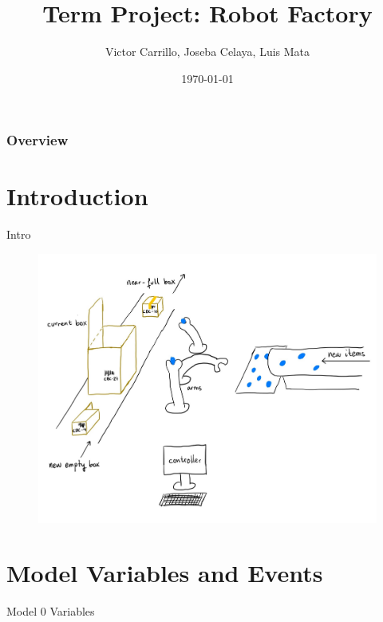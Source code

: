 \documentclass{beamer}
\title[Short title]{Term Project: Robot Factory}
\author{Victor Carrillo, Joseba Celaya, Luis Mata}
\institute[UCM/UAM/UPM]{

\medskip
}
\date{\today}
\begin{document}
\begin{frame}
\titlepage 
\end{frame}

\begin{frame}
\frametitle{Overview} 
\tableofcontents 
\end{frame}


\section{Introduction}

\begin{frame}[containsverbatim]{Intro}
\begin{figure}[htbp]
  \centering
  \includegraphics[scale=0.2]{figures/drawing.jpg}
\end{figure}
\end{frame}


\section{Model Variables and Events}

\begin{frame}[containsverbatim]{Model 0 Variables}
\begin{figure}[htbp]
  \centering
  
\end{figure}
\end{frame}
\end{document}
